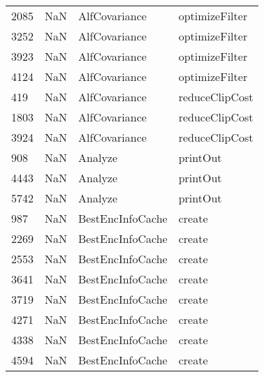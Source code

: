 \begin{tabular}{llll}
2085 &                   NaN &              AlfCovariance &                            optimizeFilter \\
3252 &                   NaN &              AlfCovariance &                            optimizeFilter \\
3923 &                   NaN &              AlfCovariance &                            optimizeFilter \\
4124 &                   NaN &              AlfCovariance &                            optimizeFilter \\
419  &                   NaN &              AlfCovariance &                            reduceClipCost \\
1803 &                   NaN &              AlfCovariance &                            reduceClipCost \\
3924 &                   NaN &              AlfCovariance &                            reduceClipCost \\
908  &                   NaN &                    Analyze &                                  printOut \\
4443 &                   NaN &                    Analyze &                                  printOut \\
5742 &                   NaN &                    Analyze &                                  printOut \\
987  &                   NaN &           BestEncInfoCache &                                    create \\
2269 &                   NaN &           BestEncInfoCache &                                    create \\
2553 &                   NaN &           BestEncInfoCache &                                    create \\
3641 &                   NaN &           BestEncInfoCache &                                    create \\
3719 &                   NaN &           BestEncInfoCache &                                    create \\
4271 &                   NaN &           BestEncInfoCache &                                    create \\
4338 &                   NaN &           BestEncInfoCache &                                    create \\
4594 &                   NaN &           BestEncInfoCache &                                    create \\

\end{tabular}
